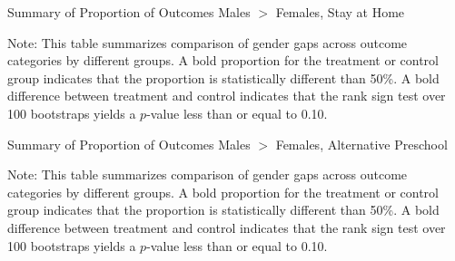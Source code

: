 \begin{table}[H]
\centering
\caption{Summary of Proportion of Outcomes Males $>$ Females, Stay at Home}
\label{tab:proportion-table-home}
\begin{threeparttable}

\begin{tablenotes}
\footnotesize
\item Note: This table summarizes comparison of gender gaps across outcome categories by different groups. A bold proportion for the treatment or control group indicates that the proportion is statistically different than 50\%. A bold difference between treatment and control indicates that the rank sign test over 100 bootstraps yields a $p$-value less than or equal to 0.10. 
\end{tablenotes}
\end{threeparttable}
\end{table}

\begin{table}[H]
\centering
\caption{Summary of Proportion of Outcomes Males $>$ Females, Alternative Preschool}
\label{tab:proportion-table-alt}
\begin{threeparttable}

\begin{tablenotes}
\footnotesize
\item Note: This table summarizes comparison of gender gaps across outcome categories by different groups. A bold proportion for the treatment or control group indicates that the proportion is statistically different than 50\%. A bold difference between treatment and control indicates that the rank sign test over 100 bootstraps yields a $p$-value less than or equal to 0.10. 
\end{tablenotes}
\end{threeparttable}
\end{table}

